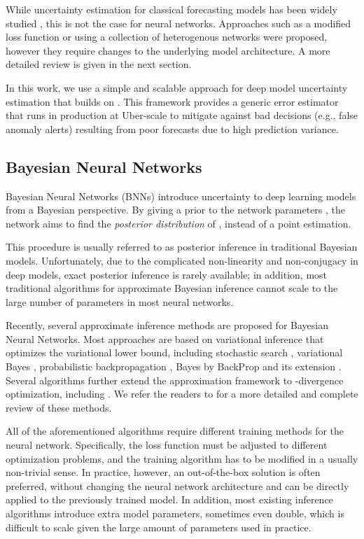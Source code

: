 \documentclass[conference,compsoc,final]{IEEEtran}
\begin{document}
While uncertainty estimation for classical forecasting models has been widely studied \cite{622683}, this is not the case for neural networks. Approaches such as a modified loss function or using a collection of heterogenous networks \cite{gal2017concrete} were proposed, however they require changes to the underlying model architecture. A more detailed review is given in the next section. 

In this work, we use a simple and scalable approach for deep model uncertainty estimation that builds on \cite{gal2016dropout}. This framework provides a generic error estimator that runs in production 
at Uber-scale
to mitigate against bad decisions (e.g., false anomaly alerts) 
resulting from poor forecasts due to high prediction variance. 

\subsection{Bayesian Neural Networks}
\label{sec:bnn}
Bayesian Neural Networks (BNNs) introduce uncertainty to deep learning models from a Bayesian perspective. By giving a prior to the network parameters ,  the network aims to find the {\it posterior distribution} of , instead of a point estimation.

This procedure is usually referred to as posterior inference in traditional Bayesian models. Unfortunately, due to the complicated non-linearity and non-conjugacy in deep models, exact posterior inference is rarely available; in addition, most traditional algorithms for approximate Bayesian inference cannot scale to the large number of parameters in most neural networks.

Recently, several approximate inference methods are proposed for Bayesian Neural Networks. Most approaches are based on variational inference that optimizes the variational lower bound, including stochastic search \cite{paisley2012variational}, variational Bayes \cite{kingma2013auto}, probabilistic backpropagation \cite{hernandez2015probabilistic}, Bayes by BackProp \cite{blundell2015weight} and its extension \cite{fortunato2017bayesian}. Several algorithms further extend the approximation framework to -divergence optimization, including \cite{hernandez2016black, li2017dropout}. We refer the readers to \cite{gal2016uncertainty} for a more detailed and complete review of these methods.

All of the aforementioned algorithms require different training methods for the neural network. Specifically, the loss function must be adjusted to different optimization problems, and the training algorithm has to be modified in a usually non-trivial sense. In practice, however, an out-of-the-box solution is often preferred, without changing the neural network architecture and can be directly applied to the previously trained model. In addition, most existing inference algorithms introduce extra model parameters, sometimes even double, which is difficult to scale given the large amount of parameters used in practice.
\end{document}
